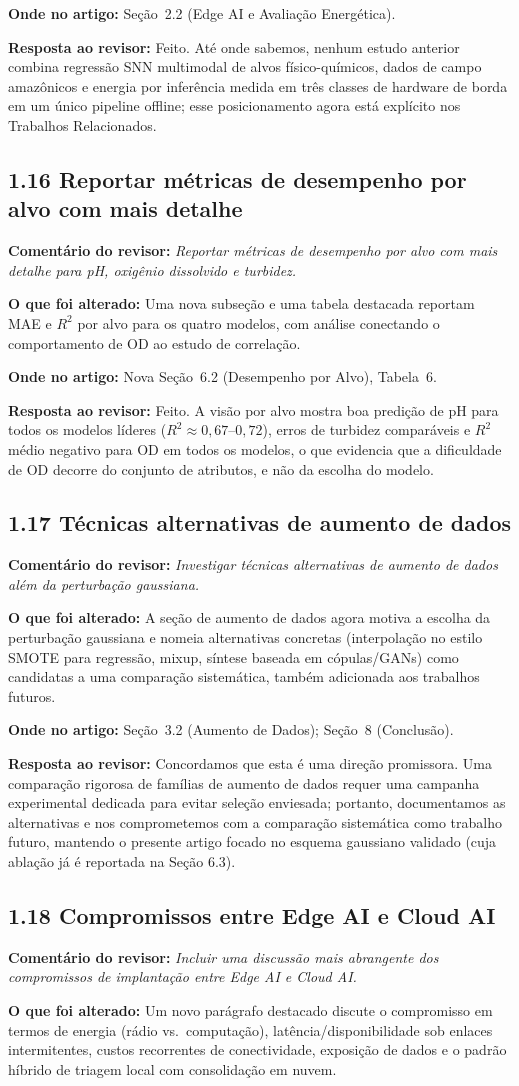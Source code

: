 \documentclass[11pt,a4paper]{article}
\newcommand{\comment}[1]{\textbf{Comentário do revisor:} \textit{#1}}
\newcommand{\change}[1]{\textbf{O que foi alterado:} #1}
\newcommand{\where}[1]{\textbf{Onde no artigo:} #1}
\newcommand{\resp}[1]{\textbf{Resposta ao revisor:} \textcolor{revblue}{#1}}
\newcommand{\pt}[1]{\subsection*{#1}}
\begin{document}
\where{Seção~2.2 (Edge AI e Avaliação Energética).}

\resp{Feito. Até onde sabemos, nenhum estudo anterior combina regressão SNN multimodal de alvos físico-químicos, dados de campo amazônicos e energia por inferência medida em três classes de hardware de borda em um único pipeline offline; esse posicionamento agora está explícito nos Trabalhos Relacionados.}

\pt{1.16 Reportar métricas de desempenho por alvo com mais detalhe}
\comment{Reportar métricas de desempenho por alvo com mais detalhe para pH, oxigênio dissolvido e turbidez.}

\change{Uma nova subseção e uma tabela destacada reportam MAE e $R^2$ por alvo para os quatro modelos, com análise conectando o comportamento de OD ao estudo de correlação.}

\where{Nova Seção~6.2 (Desempenho por Alvo), Tabela~6.}

\resp{Feito. A visão por alvo mostra boa predição de pH para todos os modelos líderes ($R^2 \approx 0{,}67$--$0{,}72$), erros de turbidez comparáveis e $R^2$ médio negativo para OD em todos os modelos, o que evidencia que a dificuldade de OD decorre do conjunto de atributos, e não da escolha do modelo.}

\pt{1.17 Técnicas alternativas de aumento de dados}
\comment{Investigar técnicas alternativas de aumento de dados além da perturbação gaussiana.}

\change{A seção de aumento de dados agora motiva a escolha da perturbação gaussiana e nomeia alternativas concretas (interpolação no estilo SMOTE para regressão, mixup, síntese baseada em cópulas/GANs) como candidatas a uma comparação sistemática, também adicionada aos trabalhos futuros.}

\where{Seção~3.2 (Aumento de Dados); Seção~8 (Conclusão).}

\resp{Concordamos que esta é uma direção promissora. Uma comparação rigorosa de famílias de aumento de dados requer uma campanha experimental dedicada para evitar seleção enviesada; portanto, documentamos as alternativas e nos comprometemos com a comparação sistemática como trabalho futuro, mantendo o presente artigo focado no esquema gaussiano validado (cuja ablação já é reportada na Seção 6.3).}

\pt{1.18 Compromissos entre Edge AI e Cloud AI}
\comment{Incluir uma discussão mais abrangente dos compromissos de implantação entre Edge AI e Cloud AI.}

\change{Um novo parágrafo destacado discute o compromisso em termos de energia (rádio vs.\ computação), latência/disponibilidade sob enlaces intermitentes, custos recorrentes de conectividade, exposição de dados e o padrão híbrido de triagem local com consolidação em nuvem.}
\end{document}
